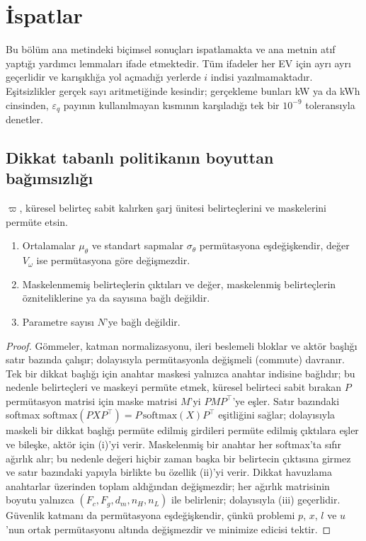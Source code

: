 \section{İspatlar}\label{app:proofs}

Bu bölüm ana metindeki biçimsel sonuçları ispatlamakta ve ana metnin atıf yaptığı yardımcı lemmaları ifade etmektedir.
Tüm ifadeler her EV için ayrı ayrı geçerlidir ve karışıklığa yol açmadığı yerlerde $i$ indisi yazılmamaktadır.
Eşitsizlikler gerçek sayı aritmetiğinde kesindir; gerçekleme bunları kW ya da kWh cinsinden, $\varepsilon_q$ payının kullanılmayan kısmının karşıladığı tek bir $10^{-9}$ toleransıyla denetler.

\subsection{Dikkat tabanlı politikanın boyuttan bağımsızlığı}\label{app:equivariance}

\begin{lemma}\label{lem:equivariance}
$\varpi$, küresel belirteç sabit kalırken şarj ünitesi belirteçlerini ve maskelerini permüte etsin.
\begin{enumerate}
\item[(i)] Ortalamalar $\mu_{\theta}$ ve standart sapmalar $\sigma_{\theta}$ permütasyona eşdeğişkendir, değer $V_\omega$ ise permütasyona göre değişmezdir.
\item[(ii)] Maskelenmemiş belirteçlerin çıktıları ve değer, maskelenmiş belirteçlerin özniteliklerine ya da sayısına bağlı değildir.
\item[(iii)] Parametre sayısı $N$'ye bağlı değildir.
\end{enumerate}
\end{lemma}

\begin{proof}
Gömmeler, katman normalizasyonu, ileri beslemeli bloklar ve aktör başlığı satır bazında çalışır; dolayısıyla permütasyonla değişmeli (commute) davranır.
Tek bir dikkat başlığı için anahtar maskesi yalnızca anahtar indisine bağlıdır; bu nedenle belirteçleri ve maskeyi permüte etmek, küresel belirteci sabit bırakan $P$ permütasyon matrisi için maske matrisi $M$'yi $PMP^\top$'ye eşler.
Satır bazındaki softmax $\mathrm{softmax}(PXP^\top)=P\,\mathrm{softmax}(X)P^\top$ eşitliğini sağlar; dolayısıyla maskeli bir dikkat başlığı permüte edilmiş girdileri permüte edilmiş çıktılara eşler ve bileşke, aktör için (i)'yi verir.
Maskelenmiş bir anahtar her softmax'ta sıfır ağırlık alır; bu nedenle değeri hiçbir zaman başka bir belirtecin çıktısına girmez ve satır bazındaki yapıyla birlikte bu özellik (ii)'yi verir.
Dikkat havuzlama anahtarlar üzerinden toplam aldığından değişmezdir; her ağırlık matrisinin boyutu yalnızca $(F_c,F_g,d_m,n_H,n_L)$ ile belirlenir; dolayısıyla (iii) geçerlidir.
Güvenlik katmanı da permütasyona eşdeğişkendir, çünkü problemi $p$, $x$, $l$ ve $u$'nun ortak permütasyonu altında değişmezdir ve minimize edicisi tektir.
\end{proof}

